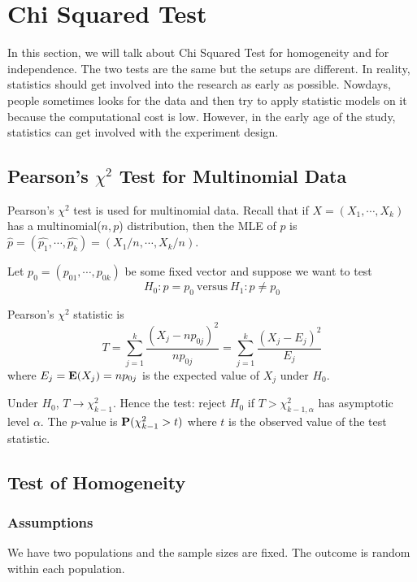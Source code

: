 \section{Chi Squared Test}
In this section, we will talk about Chi Squared Test for homogeneity and for independence. The two tests are the same but the setups are different. In reality, statistics should get involved into the research as early as possible. Nowdays, people sometimes looks for the data and then try to apply statistic models on it because the computational cost is low. However, in the early age of the study, statistics can get involved with the experiment design.

\subsection{Pearson's $\chi^2$ Test for Multinomial Data}
Pearson's $\chi^2$ test is used for multinomial data. Recall that if $X = (X_1, \cdots, X_k)$ has a multinomial($n,p$) distribution, then the MLE of $p$ is $\hat{p} = (\hat{p_1}, \cdots, \hat{p_k}) = (X_1/n, \cdots, X_k/n)$.

Let $p_0 = (p_{01}, \cdots, p_{0k})$ be some fixed vector and suppose we want to test
\[H_0: p=p_0 ~\text{versus}~ H_1: p \neq p_0\]

\begin{definition}
	Pearson's $\chi^2$ statistic is
	\[T = \sum_{j=1}^{k} \frac{(X_j - np_{0j})^2}{n p_{0j}} = \sum_{j = 1}^{k} \frac{(X_j - E_j)^2}{E_j}\]
	where $E_j = \E(X_j) = np_{0j}$ is the expected value of $X_j$ under $H_0$.
\end{definition}

\begin{theorem}Under $H_0$, $T \rightarrow \chi^2_{k-1}$. Hence the test: reject $H_0$ if $T > \chi^2_{k-1, \alpha}$ has asymptotic level $\alpha$. The $p$-value is $\P(\chi^2_{k-1} > t)$ where $t$ is the observed value of the test statistic.
\end{theorem}
\newpage
\subsection{Test of Homogeneity}
\subsubsection{Assumptions}
We have two populations and the sample sizes are fixed. The outcome is random within each population.


